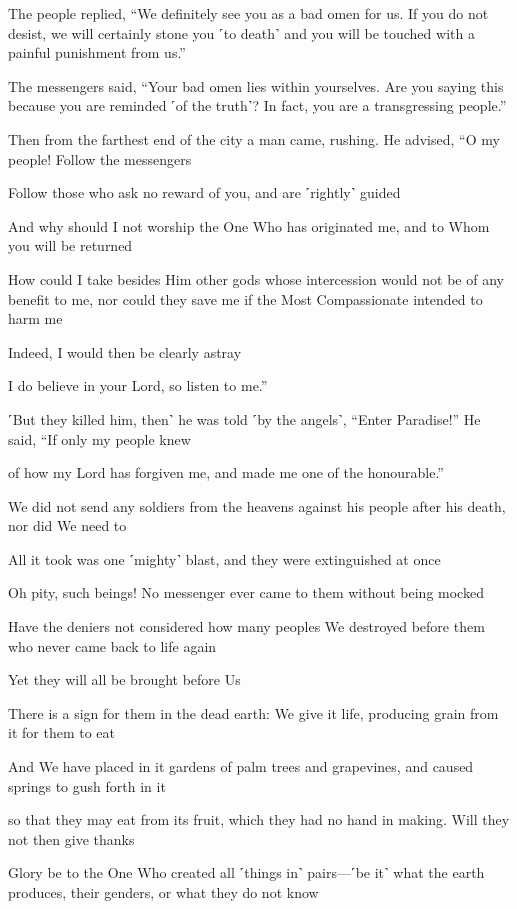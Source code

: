 The people replied, “We definitely see you as a bad omen for us. If you do not desist, we will certainly stone you ˹to death˺ and you will be touched with a painful punishment from us.”

The messengers said, “Your bad omen lies within yourselves. Are you saying this because you are reminded ˹of the truth˺? In fact, you are a transgressing people.”

Then from the farthest end of the city a man came, rushing. He advised, “O my people! Follow the messengers

Follow those who ask no reward of you, and are ˹rightly˺ guided

And why should I not worship the One Who has originated me, and to Whom you will be returned

How could I take besides Him other gods whose intercession would not be of any benefit to me, nor could they save me if the Most Compassionate intended to harm me

Indeed, I would then be clearly astray

I do believe in your Lord, so listen to me.”

˹But they killed him, then˺ he was told ˹by the angels˺, “Enter Paradise!” He said, “If only my people knew

of how my Lord has forgiven me, and made me one of the honourable.”

We did not send any soldiers from the heavens against his people after his death, nor did We need to

All it took was one ˹mighty˺ blast, and they were extinguished at once

Oh pity, such beings! No messenger ever came to them without being mocked

Have the deniers not considered how many peoples We destroyed before them who never came back to life again

Yet they will all be brought before Us

There is a sign for them in the dead earth: We give it life, producing grain from it for them to eat

And We have placed in it gardens of palm trees and grapevines, and caused springs to gush forth in it

so that they may eat from its fruit, which they had no hand in making. Will they not then give thanks

Glory be to the One Who created all ˹things in˺ pairs—˹be it˺ what the earth produces, their genders, or what they do not know


